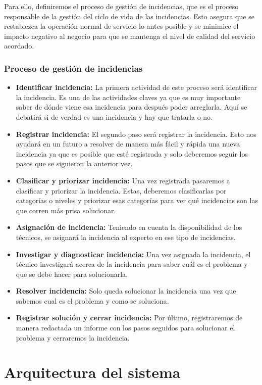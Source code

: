 Para ello, definiremos el proceso de gestión de incidencias, que es el proceso responsable de la gestión del ciclo de vida de las incidencias. Esto asegura que se restablezca la operación normal de servicio lo antes posible y se minimice el impacto negativo al negocio para que se mantenga el nivel de calidad del servicio acordado.
\subsubsection{Proceso de gestión de incidencias}
\begin{itemize}
\item{\textbf{Identificar incidencia:}} La primera actividad de este proceso será identificar la incidencia. Es una de las actividades claves ya que es muy importante saber de dónde viene esa incidencia para después poder arreglarla. Aquí se debatirá si de verdad es una incidencia y hay que tratarla o no.
\item {\textbf{Registrar incidencia:}} El segundo paso será registrar la incidencia. Esto nos ayudará en un futuro a resolver de manera más fácil y rápida una nueva incidencia ya que es posible que esté registrada y solo deberemos seguir los pasos que se siguieron la anterior vez.
\item{\textbf{Clasificar y priorizar incidencia:}} Una vez registrada pasaremos a clasificar y priorizar la incidencia. Estas, deberemos clasificarlas por categorías o niveles y priorizar esas categorías para ver qué incidencias son las que corren más prisa solucionar.
\item{\textbf{Asignación de incidencia:}} Teniendo en cuenta la disponibilidad de los técnicos, se asignará la incidencia al experto en ese tipo de incidencias.
\item{\textbf{Investigar y diagnosticar incidencia:}} Una vez asignada la incidencia, el técnico investigará acerca de la incidencia para saber cuál es el problema y que se debe hacer para solucionarla.
\item{\textbf{Resolver incidencia:}} Solo queda solucionar la incidencia una vez que sabemos cual es el problema y como se soluciona.
\item{\textbf{Registrar solución y cerrar incidencia:}} Por último, registraremos de manera redactada un informe con los pasos seguidos para solucionar el problema y cerraremos la incidencia.
\end{itemize}
\section{Arquitectura del sistema}
